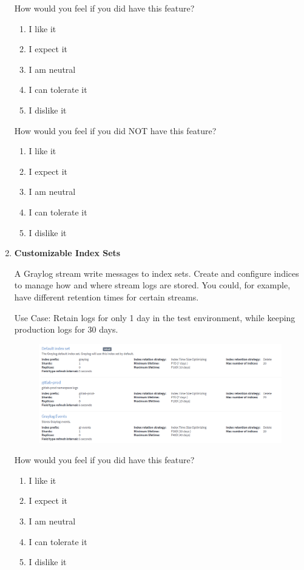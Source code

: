 \documentclass[../main.tex]{subfiles}
\begin{document}
\begin{enumerate}
    How would you feel if you did have this feature?
    \begin{enumerate}
        \item I like it
        \item I expect it
        \item  I am neutral
        \item I can tolerate it
        \item I dislike it
    \end{enumerate}

    How would you feel if you did NOT have this feature?
    \begin{enumerate}
        \item I like it
        \item I expect it
        \item  I am neutral
        \item I can tolerate it
        \item I dislike it
    \end{enumerate}

    \clearpage
    \item \textbf{Customizable Index Sets}
    
    A Graylog stream write messages to index sets. Create and configure indices to manage how and where stream logs are stored. You could, for example, have different retention times for certain streams. 
    
    Use Case: Retain logs for only 1 day in the test environment, while keeping production logs for 30 days.

    \begin{figure}[H]
        \centering
        \includegraphics[scale=0.68]{img/10-appendix/indices.png}
        \label{fig:indices}
    \end{figure}

    How would you feel if you did have this feature?
    \begin{enumerate}
        \item I like it
        \item I expect it
        \item  I am neutral
        \item I can tolerate it
        \item I dislike it
    \end{enumerate}


\end{enumerate}
\end{document}
